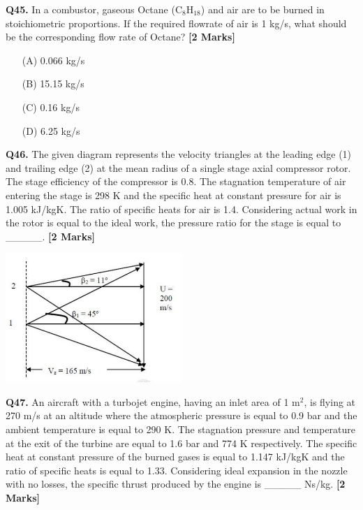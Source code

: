 \documentclass[11pt]{article}
\newcommand{\questionb}[2]{
    \noindent\textbf{Q#2.} #1 \hfill \textbf{[2 Marks]}
}
\begin{document}
\vspace{0.5cm}

\questionb{In a combustor, gaseous Octane (C$_8$H$_{18}$) and air are to be burned in stoichiometric proportions. If the required flowrate of air is 1 kg/s, what should be the corresponding flow rate of Octane?}{45}
\begin{enumerate}
    \item[(A)] 0.066 kg/s
    \item[(B)] 15.15 kg/s
    \item[(C)] 0.16 kg/s
    \item[(D)] 6.25 kg/s
\end{enumerate}

\vspace{0.5cm}

\questionb{The given diagram represents the velocity triangles at the leading edge (1) and trailing edge (2) at the mean radius of a single stage axial compressor rotor. The stage efficiency of the compressor is 0.8. The stagnation temperature of air entering the stage is 298 K and the specific heat at constant pressure for air is 1.005 kJ/kgK. The ratio of specific heats for air is 1.4. Considering actual work in the rotor is equal to the ideal work, the pressure ratio for the stage is equal to \_\_\_\_\_.}{46}
\begin{center}
\includegraphics[width=0.5\textwidth]{figures/46.png}
\end{center}

\vspace{0.5cm}

\questionb{An aircraft with a turbojet engine, having an inlet area of 1 m$^2$, is flying at 270 m/s at an altitude where the atmospheric pressure is equal to 0.9 bar and the ambient temperature is equal to 290 K. The stagnation pressure and temperature at the exit of the turbine are equal to 1.6 bar and 774 K respectively. The specific heat at constant pressure of the burned gases is equal to 1.147 kJ/kgK and the ratio of specific heats is equal to 1.33. Considering ideal expansion in the nozzle with no losses, the specific thrust produced by the engine is \_\_\_\_\_ Ns/kg.}{47}
\end{document}
